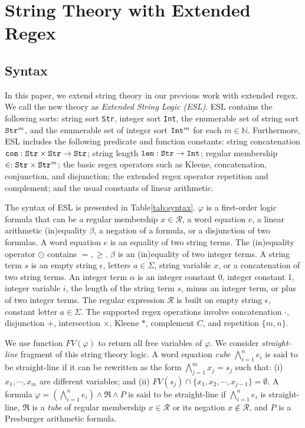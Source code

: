 \documentclass[sigconf]{acmart}
\newcommand*{\regex}{\mathcal{R}}
\begin{document}
\section{String Theory with Extended Regex} \label{sec:str_t}
\subsection{Syntax}
In this paper, we extend string theory in our previous work \cite{atva2020} with extended regex. We call
the new theory as \textit{Extended String Logic (ESL)}. ESL contains the following
sorts: string sort \verb|Str|, integer sort \verb|Int|, the enumerable set of string
sort $\verb|Str|^m$, and the enumerable set of integer sort $\verb|Int|^m$ for each $m\in
  \mathbb{N}$. Furthermore, ESL includes the following predicate and function constants:
string concatenation $\verb|con|:\verb|Str|\times\verb|Str|\rightarrow \verb|Str|$;
string length $\verb|len|: \verb|Str|\rightarrow \verb|Int|$; regular membership $\in:
\verb|Str|\times \verb|Str|^m$; the basic regex operators such as Kleene, concatenation,  conjunction, and disjunction; the extended regex operator repetition and complement; and the usual constants of linear arithmetic. 

The syntax of ESL is presented in Table\ref{tab:syntax}. $\varphi$ is a first-order logic formula that can be a regular membership $x\in\regex$,
a word equation $e$, a linear arithmetic (in)equality $\beta$, a negation of a formula, or a
disjunction of two formulas. A word equation $e$ is an equality of two string terms. The
(in)equality operator $\odot$ contains $=, \geq$. $\beta$ is an (in)equality
of two integer terms. A string term $s$ is an empty string $\epsilon$, letters
$a\in\Sigma$, string variable $x$, or a concatenation of two string terms. An integer
term $\alpha$ is an integer constant 0, integer constant 1, integer variable $i$, the
length of the string term $s$, minus an integer term, or plus of two integer terms. The
regular expression $\regex$ is built on empty string $\epsilon$, constant letter $a\in \Sigma$. The supported regex operations involve concatenation $\cdot$, disjunction $+$,
intersection $\times$, Kleene $*$, complement $C$, and repetition $\{m, n\}$.

We use function $FV(\varphi)$ to return all free variables of $\varphi$. We consider \emph{straight-line} fragment\cite{atva2020}\cite{quadratic_aplas2018} of this string theory logic. A word equation \emph{cube} $\bigwedge_{i=1}^n e_i$ is said to be straight-line if it can be rewritten as the form $\bigwedge_{j=1}^m x_j = s_j$ such that: (i) $x_1, \cdots, x_m$ are different variables; and (ii) $FV(s_j)\cap \{x_1, x_2,
  \cdots, x_{j-1}\} = \emptyset$. A formula $\varphi = (\bigwedge_{i=1}^n e_i) \wedge \Re \wedge P$
is said to be straight-line if $\bigwedge_{i=1}^n e_i$ is straight-line, $\Re$ is a
\emph{tube} of regular membership $x\in \regex$ or its negation $x\not\in \regex$, and $P$ is a Presburger arithmetic formula.
\end{document}
